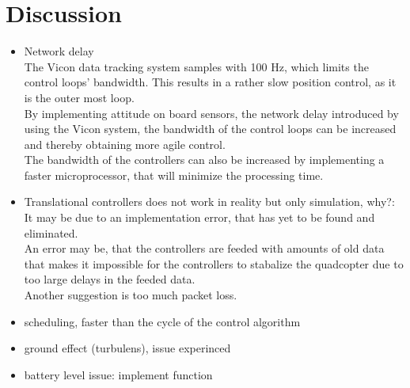 \chapter{Discussion}
\begin{itemize}
\item Network delay\\
The Vicon data tracking system samples with 100 Hz, which limits the control loops' bandwidth. This results in a rather slow position control, as it is the outer most loop.\\
By implementing attitude on board sensors, the network delay introduced by using the Vicon system, the bandwidth of the control loops can be increased and thereby obtaining more agile control.\\
The bandwidth of the controllers can also be increased by implementing a faster microprocessor, that will minimize the processing time.

\item Translational controllers does not work in reality but only simulation, why?:\\
It may be due to an implementation error, that has yet to be found and eliminated.\\
An error may be, that the controllers are feeded with amounts of old data that makes it impossible for the controllers to stabalize the quadcopter due to too large delays in the feeded data.\\
Another suggestion is too much packet loss. 

\item scheduling, faster than the cycle of the control algorithm 

\item ground effect (turbulens), issue experinced

\item battery level issue: implement function
  

\end{itemize}
